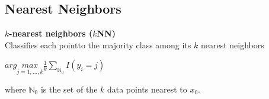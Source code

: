 		\subsection{Nearest Neighbors}
			\textbf{$k$-nearest neighbors ($k$NN)}\\
			Classifies each pointto the majority class among its $k$ nearest neighbors
			\begin{center}
				$arg \underset{j=1,...,k}{max} \frac{1}{k} \sum\limits_{\mathbb{N}_0} I(y_i = j)$
			\end{center}
			where $\mathbb{N}_0$ is the set of the $k$ data points nearest to $x_0$.
			
			\begin{figure}[ht]
			  \centering
			  \qquad
			  \qquad
			\end{figure}

